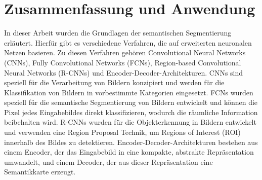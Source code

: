 \chapter{Zusammenfassung und Anwendung}
In dieser Arbeit wurden die Grundlagen der semantischen Segmentierung
erläutert. Hierfür gibt es verschiedene Verfahren, die auf erweiterten
neuronalen Netzen basieren. Zu diesen Verfahren gehören Convolutional Neural
Networks (CNNs), Fully Convolutional Networks (FCNs), Region-based
Convolutional Neural Networks (R-CNNs) und Encoder-Decoder-Architekturen. CNNs
sind speziell für die Verarbeitung von Bildern konzipiert und werden für die
Klassifikation von Bildern in vorbestimmte Kategorien eingesetzt. FCNs wurden
speziell für die semantische Segmentierung von Bildern entwickelt und können
die Pixel jedes Eingabebildes direkt klassifizieren, wodurch die räumliche
Information beibehalten wird. R-CNNs wurden für die Objekterkennung in Bildern
entwickelt und verwenden eine Region Proposal Technik, um Regions of Interest
(ROI) innerhalb des Bildes zu detektieren. Encoder-Decoder-Architekturen
bestehen aus einem Encoder, der das Eingabebild in eine kompakte, abstrakte
Repräsentation umwandelt, und einem Decoder, der aus dieser Repräsentation eine
Semantikkarte erzeugt.